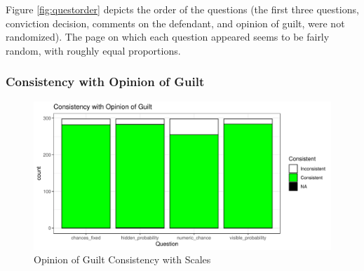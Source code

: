 \documentclass[print]{nuthesis}
\begin{document}
Figure \ref{fig:questorder} depicts the order of the questions (the first three questions, conviction decision, comments on the defendant, and opinion of guilt, were not randomized).
The page on which each question appeared seems to be fairly random, with roughly equal proportions.

\hypertarget{consistency-with-opinion-of-guilt}{%
\subsubsection{Consistency with Opinion of Guilt}\label{consistency-with-opinion-of-guilt}}

\begin{figure}

{\centering \includegraphics[width=\linewidth]{thesis_files/figure-latex/opinioncomp-1} 

}

\caption{Opinion of Guilt Consistency with Scales}\label{fig:opinioncomp}
\end{figure}
\end{document}
